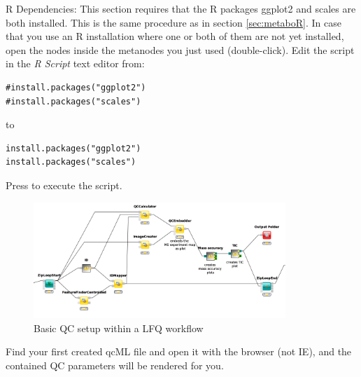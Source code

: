 R Dependencies: This section requires that the R packages ggplot2 and scales are both installed. This is the same procedure as in section \ref{sec:metaboR}. In case that you use an R installation where one or both of them are not yet installed, open the  nodes inside the metanodes you just used (double-click). Edit the script in the \textit{R Script} text editor from:\\

\begin{lstlisting}
#install.packages("ggplot2")
#install.packages("scales")
\end{lstlisting}
to 
\begin{lstlisting}
install.packages("ggplot2")
install.packages("scales")
\end{lstlisting}
Press  to execute the script.\newline

\vspace{1cm}

\begin{figure}[htbp]
  \centering
  \includegraphics[width=0.85\textwidth]{graphics/qc/qc_basic}
  \caption{Basic QC setup within a LFQ workflow}
  \label{fig:qc_basic}
\end{figure}

\begin{task}
Find your first created qcML file and open it with the browser (not IE), and the contained QC parameters will be rendered for you.
\end{task}


